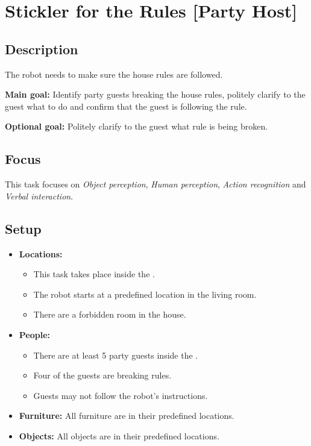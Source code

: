 \section{Stickler for the Rules [Party Host]}
\label{test:stickler-for-the-rules}

\subsection*{Description}
The robot needs to make sure the house rules are followed.

\textbf{Main goal:}
Identify party guests breaking the house rules, politely clarify to the guest what to do and confirm that the guest is following the rule.

\textbf{Optional goal:}
Politely clarify to the guest what rule is being broken.


\subsection*{Focus}
This task focuses on
\textit{Object perception},
\textit{Human perception},
\textit{Action recognition} and
\textit{Verbal interaction}.

\subsection*{Setup}
\begin{itemize}[nosep]	
	\item \textbf{Locations:} 
	\begin{itemize}
		\item This task takes place inside the \Arena{}.
		\item The robot starts at a predefined location in the living room.
		\item There are a forbidden room in the house.
	\end{itemize}	 
	\item \textbf{People:} 
	\begin{itemize}
		\item There are at least 5 party guests inside the \Arena{}.
		\item Four of the guests are breaking rules.
		\item Guests may not follow the robot's instructions.
	\end{itemize}
	\item \textbf{Furniture:} All furniture are in their predefined locations.
	\item \textbf{Objects:} All objects are in their predefined locations.
\end{itemize}

